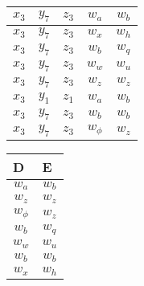 \documentclass{article}
\begin{document}
{\begin{center}
\begin{tabular}{lllll}
    \multicolumn{1}{|c|}{$x_3$} & \multicolumn{1}{c|}{$y_7$} & \multicolumn{1}{c|}{$z_3$} & \multicolumn{1}{c|}{$w_a$} & \multicolumn{1}{c|}{$w_b$}\\ \hline
    \multicolumn{1}{|c|}{$x_3$} & \multicolumn{1}{c|}{$y_7$} & \multicolumn{1}{c|}{$z_3$} & \multicolumn{1}{c|}{$w_x$} & \multicolumn{1}{c|}{$w_h$}\\ \hline
    \multicolumn{1}{|c|}{$x_3$} & \multicolumn{1}{c|}{$y_7$} & \multicolumn{1}{c|}{$z_3$} & \multicolumn{1}{c|}{$w_b$} & \multicolumn{1}{c|}{$w_q$}\\ \hline
    \multicolumn{1}{|c|}{$x_3$} & \multicolumn{1}{c|}{$y_7$} & \multicolumn{1}{c|}{$z_3$} & \multicolumn{1}{c|}{$w_w$} & \multicolumn{1}{c|}{$w_u$}\\ \hline
    \multicolumn{1}{|c|}{$x_3$} & \multicolumn{1}{c|}{$y_7$} & \multicolumn{1}{c|}{$z_3$} & \multicolumn{1}{c|}{$w_z$} & \multicolumn{1}{c|}{$w_z$}\\ \hline
    \multicolumn{1}{|c|}{$x_3$} & \multicolumn{1}{c|}{$y_1$} & \multicolumn{1}{c|}{$z_1$} & \multicolumn{1}{c|}{$w_a$} & \multicolumn{1}{c|}{$w_b$}\\ \hline
    \multicolumn{1}{|c|}{$x_3$} & \multicolumn{1}{c|}{$y_7$} & \multicolumn{1}{c|}{$z_3$} & \multicolumn{1}{c|}{$w_b$} & \multicolumn{1}{c|}{$w_b$}\\ \hline
    \multicolumn{1}{|c|}{$x_3$} & \multicolumn{1}{c|}{$y_7$} & \multicolumn{1}{c|}{$z_3$} & \multicolumn{1}{c|}{$w_\phi$} & \multicolumn{1}{c|}{$w_z$}\\ \hline
  \end{tabular}
\end{center}
}
\parbox{.45\linewidth}{
\begin{center}
  \begin{tabular}{ll}
  	\hline
    D & E\\
    \hline
    \multicolumn{1}{|c|}{$w_a$} & \multicolumn{1}{c|}{$w_b$}\\ \hline
    \multicolumn{1}{|c|}{$w_z$} & \multicolumn{1}{c|}{$w_z$}\\ \hline
    \multicolumn{1}{|c|}{$w_\phi$} & \multicolumn{1}{c|}{$w_z$}\\ \hline
    \multicolumn{1}{|c|}{$w_b$} & \multicolumn{1}{c|}{$w_q$}\\ \hline
    \multicolumn{1}{|c|}{$w_w$} & \multicolumn{1}{c|}{$w_u$}\\ \hline
    \multicolumn{1}{|c|}{$w_b$} & \multicolumn{1}{c|}{$w_b$}\\ \hline
    \multicolumn{1}{|c|}{$w_x$} & \multicolumn{1}{c|}{$w_h$}\\ \hline
  \end{tabular}
\end{center}
}
\end{document}
